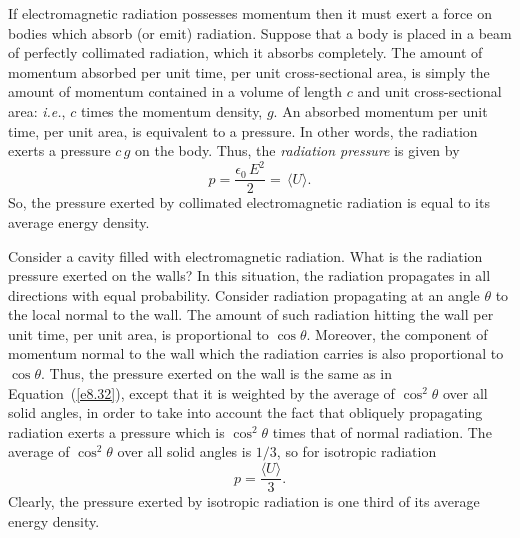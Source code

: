 If electromagnetic radiation possesses momentum then it must exert a force on
bodies which absorb (or emit) radiation. Suppose that a body is placed in
a beam of perfectly collimated radiation, which it absorbs completely. The amount
of momentum absorbed per unit time, per unit cross-sectional area, is simply the
amount of momentum contained in a volume of length $c$ and unit cross-sectional
area: {\em i.e.}, $c$ times the momentum density, $g$. An absorbed momentum per
unit time, per unit area, is equivalent to a pressure. In other words, the radiation
exerts a pressure $c\,g$ on the body. Thus, the  {\em radiation pressure} is given by
\begin{equation}\label{e8.32}
p = \frac{\epsilon_0\,E^2}{2} =\, \langle U\rangle.
\end{equation}
So, the pressure exerted by collimated electromagnetic radiation is equal to
its average energy density. 

Consider a cavity filled with electromagnetic radiation. What is the radiation
pressure exerted on the walls? In this situation, the radiation propagates in
all directions with equal probability. Consider  radiation propagating at an
angle $\theta$ to the local normal to the wall. The amount of such radiation
hitting the wall per unit time, per unit area, is proportional to $\cos\theta$.
Moreover, the component of  momentum normal to the wall which the radiation
carries is also proportional to $\cos\theta$. Thus, the pressure exerted on the
wall is the same as in Equation~(\ref{e8.32}), except that it is weighted by the
average of $\cos^2 \theta$ over all solid angles, in order to take into account
the fact 
that obliquely propagating radiation exerts a pressure which is $\cos^2\theta$
times that of normal radiation. The average of $\cos^2\theta$ over all solid angles
is $1/3$, so for isotropic radiation
\begin{equation}
p = \frac{  \langle U\rangle}{3}.
\end{equation}
Clearly, the pressure exerted by isotropic radiation is one third of
its average energy density. 

